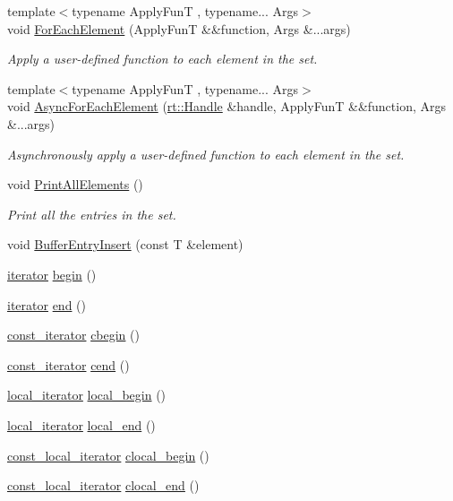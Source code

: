 \begin{DoxyCompactItemize}
{\footnotesize template$<$typename Apply\-Fun\-T , typename... Args$>$ }\\void \hyperlink{classshad_1_1Set_ae7ae217c231aa0ef54c5e2990c172b12}{For\-Each\-Element} (Apply\-Fun\-T \&\&function, Args \&...args)
\begin{DoxyCompactList}\small\item\em Apply a user-\/defined function to each element in the set. \end{DoxyCompactList}\item 
{\footnotesize template$<$typename Apply\-Fun\-T , typename... Args$>$ }\\void \hyperlink{classshad_1_1Set_ab4722765fe62737bd6b1b59635ebbe28}{Async\-For\-Each\-Element} (\hyperlink{classshad_1_1rt_1_1Handle}{rt\-::\-Handle} \&handle, Apply\-Fun\-T \&\&function, Args \&...args)
\begin{DoxyCompactList}\small\item\em Asynchronously apply a user-\/defined function to each element in the set. \end{DoxyCompactList}\item 
void \hyperlink{classshad_1_1Set_a92ae5af89da9c3232c062ecdacece447}{Print\-All\-Elements} ()
\begin{DoxyCompactList}\small\item\em Print all the entries in the set. \end{DoxyCompactList}\item 
void \hyperlink{classshad_1_1Set_aaa3c96b1f2eba65966ebc9e519adda01}{Buffer\-Entry\-Insert} (const T \&element)
\item 
\hyperlink{classshad_1_1Set_a726ddfe3c1c55db2ef60c5c1960d6666}{iterator} \hyperlink{classshad_1_1Set_ae747d10b913845091066d2393ea9695b}{begin} ()
\item 
\hyperlink{classshad_1_1Set_a726ddfe3c1c55db2ef60c5c1960d6666}{iterator} \hyperlink{classshad_1_1Set_a2e9ac1823ff085510d34773a0cb04852}{end} ()
\item 
\hyperlink{classshad_1_1Set_a0b2608f92f5397a25e62fad925fc177e}{const\-\_\-iterator} \hyperlink{classshad_1_1Set_ab486ba5133100428dbda82e28c3825db}{cbegin} ()
\item 
\hyperlink{classshad_1_1Set_a0b2608f92f5397a25e62fad925fc177e}{const\-\_\-iterator} \hyperlink{classshad_1_1Set_aa4e11c869e5268026f4d67d570808f0e}{cend} ()
\item 
\hyperlink{classshad_1_1Set_a12ce7d6fd8fd0569035b0eb236b22179}{local\-\_\-iterator} \hyperlink{classshad_1_1Set_a179918a1cbc5793a1522a00497495eeb}{local\-\_\-begin} ()
\item 
\hyperlink{classshad_1_1Set_a12ce7d6fd8fd0569035b0eb236b22179}{local\-\_\-iterator} \hyperlink{classshad_1_1Set_a274bae1a1e053109f42c8864bbc707e5}{local\-\_\-end} ()
\item 
\hyperlink{classshad_1_1Set_a0857d9ce7a249e860e3a67bc18f7de8b}{const\-\_\-local\-\_\-iterator} \hyperlink{classshad_1_1Set_af16201940dce366a4865b813031e8430}{clocal\-\_\-begin} ()
\item 
\hyperlink{classshad_1_1Set_a0857d9ce7a249e860e3a67bc18f7de8b}{const\-\_\-local\-\_\-iterator} \hyperlink{classshad_1_1Set_a9a4e1a99d244de6930a3e785fd2aedf3}{clocal\-\_\-end} ()
\end{DoxyCompactItemize}
